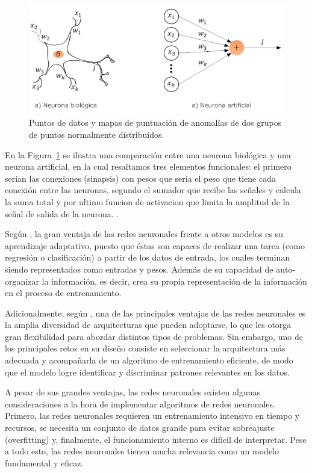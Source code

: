 \documentclass[11pt,a4paper,spanish]{book}
\numberwithin{equation}{chapter}
\numberwithin{figure}{chapter}
\begin{document}
\begin{figure}[h]
    \centering
    \includegraphics[width=1.0\textwidth]{media/neuona-artificial.png}
    \caption{Puntos de datos y mapas de puntuación de anomalías de dos grupos de puntos normalmente distribuidos.  \protect\cite{fernandez2013redes} }
    \label{fig:figNauronaArtificial}
\end{figure}


En la Figura~\ref{fig:figNauronaArtificial} se ilustra una comparación entre una neurona biológica y una neurona artificial, en la cual resaltamos tres elementos funcionales: el primero serían las conexiones (sinapsis) con pesos que seria el peso que tiene cada conexión entre las neuronas, segundo el sumador que recibe las señales y calcula la suma total y por ultimo funcion de activacion que limita la amplitud de la señal de salida de la neurona. \cite{fernandez2013redes}.


Según \cite{rivera2007redes}, la gran ventaja de las redes neuronales frente a otros modelos es su aprendizaje adaptativo, puesto que éstas son capaces de realizar una tarea (como regresión o clasificación) a partir de los datos de entrada, los cuales terminan siendo representados como entradas y pesos.  Además de su capacidad de auto-organizar la información, es decir, crea su propia representación de la información en el proceso de entrenamiento. 


Adicionalmente, según \cite{varela2011redes}, una de las principales ventajas de las redes neuronales es la amplia diversidad de arquitecturas que pueden adoptarse, lo que les otorga gran flexibilidad para abordar distintos tipos de problemas. Sin embargo, uno de los principales retos en su diseño consiste en seleccionar la arquitectura más adecuada y acompañarla de un algoritmo de entrenamiento eficiente, de modo que el modelo logre identificar y discriminar patrones relevantes en los datos. 


A pesar de sus grandes ventajas, las redes neuronales existen algunas consideraciones a la hora de implementar algoritmos de redes neuronales. Primero, las redes neuronales requieren un entrenamiento intensivo en tiempo y recursos, se necesita un conjunto de datos grande para evitar sobreajuste (overfitting) y, finalmente, el funcionamiento interno es difícil de interpretar. Pese a todo esto, las redes neuronales tienen mucha relevancia como un modelo fundamental y eficaz. \cite{larranaga2021redes}
\end{document}
